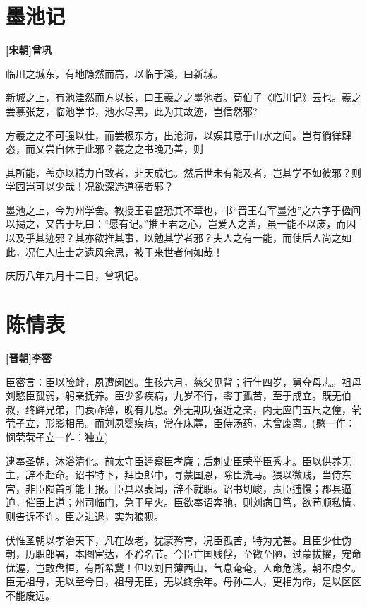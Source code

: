 \documentclass[UTF8,titlepage,oneside]{ctexbook}
\begin{document}
\chapter*{墨池记}
\begin{center}
	\textbf{[宋朝]曾巩}
\end{center}

临川之城东，有地隐然而高，以临于溪，曰新城。


新城之上，有池洼然而方以长，曰王羲之之墨池者。荀伯子《临川记》云也。羲之尝慕张芝，临池学书，池水尽黑，此为其故迹，岂信然邪?


方羲之之不可强以仕，而尝极东方，出沧海，以娱其意于山水之间。岂有徜徉肆恣，而又尝自休于此邪？羲之之书晚乃善，则


其所能，盖亦以精力自致者，非天成也。然后世未有能及者，岂其学不如彼邪？则学固岂可以少哉！况欲深造道德者邪？


墨池之上，今为州学舍。教授王君盛恐其不章也，书“晋王右军墨池”之六字于楹间以揭之，又告于巩曰：“愿有记。”推王君之心，岂爱人之善，虽一能不以废，而因以及乎其迹邪？其亦欲推其事，以勉其学者邪？夫人之有一能，而使后人尚之如此，况仁人庄士之遗风余思，被于来世者何如哉！


庆历八年九月十二日，曾巩记。



\chapter*{陈情表}
\begin{center}
	\textbf{[晋朝]李密}
\end{center}

臣密言：臣以险衅，夙遭闵凶。生孩六月，慈父见背；行年四岁，舅夺母志。祖母刘愍臣孤弱，躬亲抚养。臣少多疾病，九岁不行，零丁孤苦，至于成立。既无伯叔，终鲜兄弟，门衰祚薄，晚有儿息。外无期功强近之亲，内无应门五尺之僮，茕茕孑立，形影相吊。而刘夙婴疾病，常在床蓐，臣侍汤药，未曾废离。(愍一作：悯茕茕孑立一作：独立)

逮奉圣朝，沐浴清化。前太守臣逵察臣孝廉；后刺史臣荣举臣秀才。臣以供养无主，辞不赴命。诏书特下，拜臣郎中，寻蒙国恩，除臣洗马。猥以微贱，当侍东宫，非臣陨首所能上报。臣具以表闻，辞不就职。诏书切峻，责臣逋慢；郡县逼迫，催臣上道；州司临门，急于星火。臣欲奉诏奔驰，则刘病日笃，欲苟顺私情，则告诉不许。臣之进退，实为狼狈。

伏惟圣朝以孝治天下，凡在故老，犹蒙矜育，况臣孤苦，特为尤甚。且臣少仕伪朝，历职郎署，本图宦达，不矜名节。今臣亡国贱俘，至微至陋，过蒙拔擢，宠命优渥，岂敢盘桓，有所希冀！但以刘日薄西山，气息奄奄，人命危浅，朝不虑夕。臣无祖母，无以至今日，祖母无臣，无以终余年。母孙二人，更相为命，是以区区不能废远。
\end{document}
